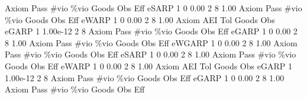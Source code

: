 {\smallskip}
{\smallskip}
{\smallskip}
       Axiom {\VBAR} Pass        \#vio        \%vio       Goods         Obs         Eff  
       eSARP {\VBAR}    1           0        0.00           2           8        1.00  
{\smallskip}
{\smallskip}
{\smallskip}
       Axiom {\VBAR} Pass        \#vio        \%vio       Goods         Obs         Eff  
       eWARP {\VBAR}    1           0        0.00           2           8        1.00  
{\smallskip}
       Axiom {\VBAR}       AEI        Tol      Goods        Obs 
       eGARP {\VBAR}         1   1.00e-12          2          8 
{\smallskip}
{\smallskip}
{\smallskip}
       Axiom {\VBAR} Pass        \#vio        \%vio       Goods         Obs         Eff  
       eGARP {\VBAR}    1           0        0.00           2           8        1.00  
{\smallskip}
{\smallskip}
{\smallskip}
       Axiom {\VBAR} Pass        \#vio        \%vio       Goods         Obs         Eff  
      eWGARP {\VBAR}    1           0        0.00           2           8        1.00  
{\smallskip}
{\smallskip}
{\smallskip}
       Axiom {\VBAR} Pass        \#vio        \%vio       Goods         Obs         Eff  
       eSARP {\VBAR}    1           0        0.00           2           8        1.00  
{\smallskip}
{\smallskip}
{\smallskip}
       Axiom {\VBAR} Pass        \#vio        \%vio       Goods         Obs         Eff  
       eWARP {\VBAR}    1           0        0.00           2           8        1.00  
{\smallskip}
       Axiom {\VBAR}       AEI        Tol      Goods        Obs 
       eGARP {\VBAR}         1   1.00e-12          2          8 
{\smallskip}
{\smallskip}
{\smallskip}
       Axiom {\VBAR} Pass        \#vio        \%vio       Goods         Obs         Eff  
       eGARP {\VBAR}    1           0        0.00           2           8        1.00  
{\smallskip}
{\smallskip}
{\smallskip}
       Axiom {\VBAR} Pass        \#vio        \%vio       Goods         Obs         Eff  
